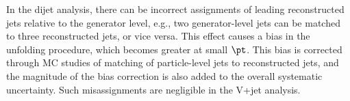 




In the dijet analysis, there can be incorrect assignments of leading
reconstructed jets relative to the generator level, e.g., two
generator-level jets can be matched to three reconstructed jets, or vice versa. 
This effect causes a bias in the unfolding procedure, which becomes greater
at small $\pt$. This bias is corrected through MC studies
of matching of particle-level jets to reconstructed jets,
and the magnitude of the bias correction is also 
added to the overall systematic uncertainty.
Such misassignments are negligible in the V+jet analysis. 

